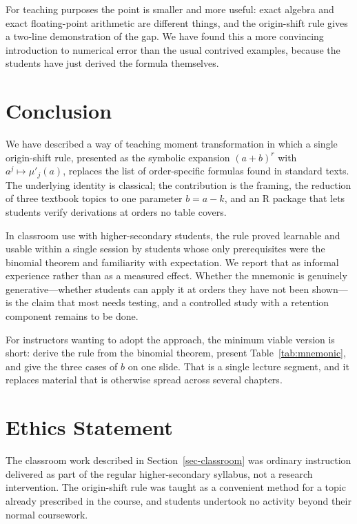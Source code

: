 \documentclass[
  12pt]{article}
\begin{document}
For teaching purposes the point is smaller and more useful: exact algebra and exact floating-point arithmetic are different things, and the origin-shift rule gives a two-line demonstration of the gap. We have found this a more convincing introduction to numerical error than the usual contrived examples, because the students have just derived the formula themselves.

\section{Conclusion}

We have described a way of teaching moment transformation in which a single origin-shift rule, presented as the symbolic expansion $(a+b)^r$ with $a^j \mapsto \mu'_j(a)$, replaces the list of order-specific formulas found in standard texts. The underlying identity is classical; the contribution is the framing, the reduction of three textbook topics to one parameter $b = a - k$, and an R package that lets students verify derivations at orders no table covers.

In classroom use with higher-secondary students, the rule proved learnable and usable within a single session by students whose only prerequisites were the binomial theorem and familiarity with expectation. We report that as informal experience rather than as a measured effect. Whether the mnemonic is genuinely generative---whether students can apply it at orders they have not been shown---is the claim that most needs testing, and a controlled study with a retention component remains to be done.

For instructors wanting to adopt the approach, the minimum viable version is short: derive the rule from the binomial theorem, present Table~\ref{tab:mnemonic}, and give the three cases of $b$ on one slide. That is a single lecture segment, and it replaces material that is otherwise spread across several chapters.

\section{Ethics Statement}

The classroom work described in Section~\ref{sec-classroom} was ordinary instruction delivered as part of the regular higher-secondary syllabus, not a research intervention. The origin-shift rule was taught as a convenient method for a topic already prescribed in the course, and students undertook no activity beyond their normal coursework.
\end{document}
